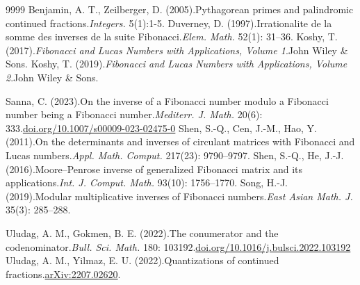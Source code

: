 \documentclass[11pt,reqno]{amsart}
\numberwithin{equation}{section}
\numberwithin{table}{section}
\numberwithin{figure}{section}
\theoremstyle{plain}
\theoremstyle{definition}
\theoremstyle{remark}
\begin{document}
\begin{thebibliography}{9999}
Benjamin, A. T., Zeilberger, D. (2005).Pythagorean primes and palindromic continued fractions.\emph{Integers.} 5(1):1-5.
Duverney, D. (1997).Irrationalite de la somme des inverses de la suite Fibonacci.\emph{Elem. Math.} 52(1): 31--36.
Koshy, T. (2017).\emph{Fibonacci and Lucas Numbers with Applications, Volume 1}.John Wiley \& Sons.
Koshy, T. (2019).\emph{Fibonacci and Lucas Numbers with Applications, Volume 2}.John Wiley \& Sons.


Sanna, C. (2023).On the inverse of a Fibonacci number modulo a Fibonacci number being a Fibonacci number.\emph{Mediterr. J. Math.} 20(6): 333.\href{https://doi.org/10.1007/s00009-023-02475-0}{doi.org/10.1007/s00009-023-02475-0}
Shen, S.-Q., Cen, J.-M., Hao, Y. (2011).On the determinants and inverses of circulant matrices with Fibonacci and Lucas numbers.\emph{Appl. Math. Comput.} 217(23): 9790--9797.
Shen, S.-Q., He, J.-J. (2016).Moore--Penrose inverse of generalized Fibonacci matrix and its applications.\emph{Int. J. Comput. Math.} 93(10): 1756--1770.
Song, H.-J. (2019).Modular multiplicative inverses of Fibonacci numbers.\emph{East Asian Math. J.} 35(3): 285--288.


Uludag, A. M., Gokmen, B. E. (2022).The conumerator and the codenominator.\emph{Bull. Sci. Math.} 180: 103192.\href{https://doi.org/10.1016/j.bulsci.2022.103192}{doi.org/10.1016/j.bulsci.2022.103192}
Uludag, A. M., Yilmaz, E. U. (2022).Quantizations of continued fractions.\href{https://arxiv.org/abs/2207.02620}{arXiv:2207.02620}.
\end{thebibliography}



\medskip%
\end{document}
